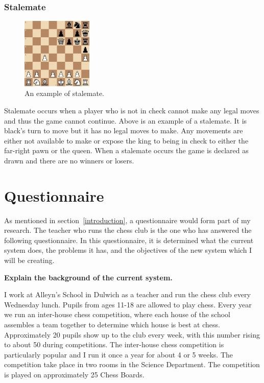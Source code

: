 \subsubsection{Stalemate}
\begin{figure}[H]
\centering
	\includegraphics[width=0.3\textwidth]{images/boards/stalemate_example}
	\caption{An example of stalemate.}
\end{figure}
Stalemate occurs when a player who is not in check cannot make any legal moves and thus the game cannot continue. Above is an example of a stalemate. It is black's turn to move but it has no legal moves to make. Any movements are either not available to make or expose the king to being in check to either the far-right pawn or the queen. When a stalemate occurs the game is declared as drawn and there are no winners or losers.
\section{Questionnaire}
As mentioned in section~\ref{introduction}, a questionnaire would form part of my research. The teacher who runs the chess club is the one who has answered the following questionnaire. In this questionnaire, it is determined what the current system does, the problems it has, and the objectives of the new system which I will be creating.

\textbf{Explain the background of the current system.}

I work at Alleyn's School in Dulwich as a teacher and run the chess club every Wednesday lunch. Pupils from ages 11-18 are allowed to play chess. Every year we run an inter-house chess competition, where each house of the school assembles a team together to determine which house is best at chess. Approximately 20 pupils show up to the club every week, with this number rising to about 50 during competitions. The inter-house chess competition is particularly popular and I run it once a year for about 4 or 5 weeks. The competition take place in two rooms in the Science Department. The competition is played on approximately 25 Chess Boards.  

